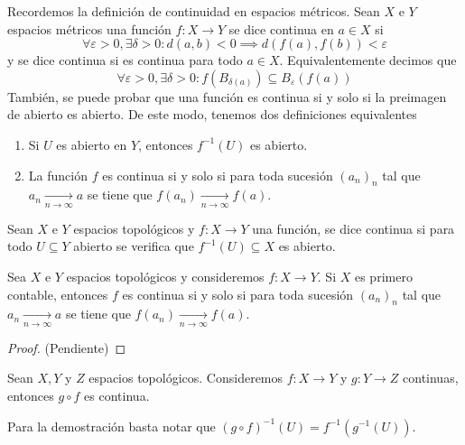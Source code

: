 \documentclass[11pt]{article}
\begin{document}
\noindent Recordemos la definición de continuidad en espacios métricos. Sean $X$ e $Y$ espacios
métricos una función $f:X\to Y$ se dice continua en $a\in X$ si
\begin{equation*}
    \forall\varepsilon>0,\exists\delta>0:d(a,b)<0\implies d(f(a),f(b))<\varepsilon
\end{equation*}
y se dice continua si es continua para todo $a\in X$. Equivalentemente decimos que
\begin{equation*}
    \forall\varepsilon>0,\exists\delta>0:f(B_{\delta(a)})\subseteq B_{\varepsilon}(f(a))
\end{equation*}
También, se puede probar que una función es continua si y solo si la preimagen de abierto es 
abierto. De este modo, tenemos dos definiciones equivalentes
\begin{enumerate}
    \item Si $U$ es abierto en $Y$, entonces $f^{-1}(U)$ es abierto.
    
    \item La función $f$ es continua si y solo si para toda sucesión $(a_{n})_{n}$ tal que
    $a_{n}\xrightarrow[n\to\infty]{}a$ se tiene que $f(a_{n})\xrightarrow[n\to\infty]{}f(a)$.
\end{enumerate}

\begin{dfn}
    Sean $X$ e $Y$ espacios topológicos y $f:X\to Y$ una función, se dice continua si para todo
    $U\subseteq Y$ abierto se verifica que $f^{-1}(U)\subseteq X$ es abierto.
\end{dfn}

\begin{teo}
    Sea $X$ e $Y$ espacios topológicos y consideremos $f:X\to Y$. Si $X$ es primero contable,
    entonces $f$ es continua si y solo si para toda sucesión $(a_{n})_{n}$ tal que 
    $a_{n}\xrightarrow[n\to\infty]{}a$ se tiene que $f(a_{n})\xrightarrow[n\to\infty]{}f(a)$.
\end{teo}

\begin{proof}
    (Pendiente)
\end{proof}

\begin{prop}
    Sean $X,Y$ y $Z$ espacios topológicos. Consideremos $f:X\to Y$ y $g:Y\to Z$ continuas, entonces
    $g\circ f$ es continua.
\end{prop}

\noindent Para la demostración basta notar que $(g\circ f)^{-1}(U)=f^{-1}(g^{-1}(U))$.
\end{document}
